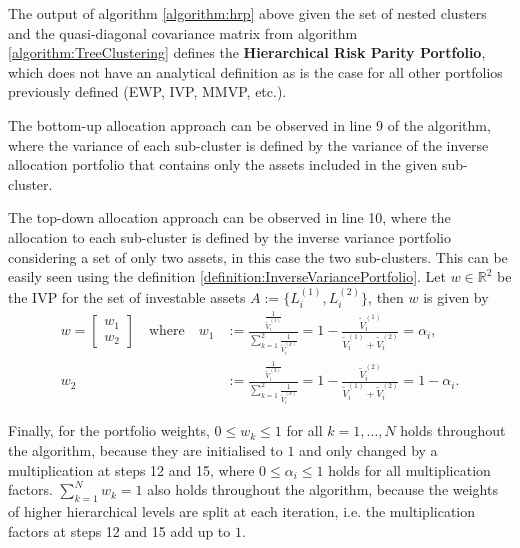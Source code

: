         The output of algorithm \ref{algorithm:hrp} above given the set of nested clusters and the quasi-diagonal covariance matrix from algorithm \ref{algorithm:TreeClustering} defines the \textbf{Hierarchical Risk Parity Portfolio}, which does not have an analytical definition as is the case for all other portfolios previously defined (EWP, IVP, MMVP, etc.).
        
        The bottom-up allocation approach can be observed in line 9 of the algorithm, where the variance of each sub-cluster is defined by the variance of the inverse allocation portfolio that contains only the assets included in the given sub-cluster.
        
        The top-down allocation approach can be observed in line 10, where the allocation to each sub-cluster is defined by the inverse variance portfolio considering a set of only two assets, in this case the two sub-clusters. This can be easily seen using the definition \ref{definition:InverseVariancePortfolio}. Let $w \in \mathbb{R}^2$ be the IVP for the set of investable assets $A := \{ L_i^{(1)}, L_i^{(2)} \}$, then $w$ is given by
        \begin{align*}
            w = \begin{bmatrix}
                w_1 \\
                w_2
            \end{bmatrix} \quad \text{where} \quad w_1 &:= \frac{\frac{1}{\tilde{V}_i^{(1)}}}{\sum_{k=1}^2 \frac{1}{\tilde{V}_i^{(k)}}} = 1 - \frac{\tilde{V}_i^{(1)}}{\tilde{V}_i^{(1)} + \tilde{V}_i^{(2)}} = \alpha_i, \\
            w_2 &:= \frac{\frac{1}{\tilde{V}_i^{(2)}}}{\sum_{k=1}^2 \frac{1}{\tilde{V}_i^{(k)}}} = 1 - \frac{\tilde{V}_i^{(2)}}{\tilde{V}_i^{(1)} + \tilde{V}_i^{(2)}} = 1 - \alpha_i.
        \end{align*}
        
        Finally, for the portfolio weights, $0 \leq w_k \leq 1$ for all $k=1, \dots, N$ holds throughout the algorithm, because they are initialised to $1$ and only changed by a multiplication at steps 12 and 15, where $0 \leq \alpha_i \leq 1$ holds for all multiplication factors. $\sum_{k=1}^N w_k = 1$ also holds throughout the algorithm, because the weights of higher hierarchical levels are split at each iteration, i.e. the multiplication factors at steps 12 and 15 add up to $1$.
        
